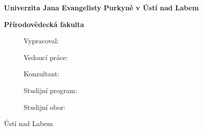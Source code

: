 

\pagestyle{empty}
\hypersetup{pageanchor=false}

\begin{center}

\null

\vspace{20mm}

{\bf\LARGE Univerzita Jana Evangelisty Purkyně v Ústí nad Labem}

\vspace{8mm}

{\bf\Large Přírodovědecká fakulta}

\vfill

\vspace{5mm}

{\Large\bfseries\NazevPrace}

{\large\bfseries\TypPrace}

\vfill


\begin{figure}[htp]
    Vypracoval:\AutorPrace

    Vedoucí práce:\Vedouci 

    Konzultant: \Vedouci

    \vspace{5mm}

    Studijní program:\StudijniProgram
    
    Studijní obor:\StudijniObor 
\end{figure}

\vfill

Ústí nad Labem \RokOdevzdani

\end{center}





%
%
%
%

